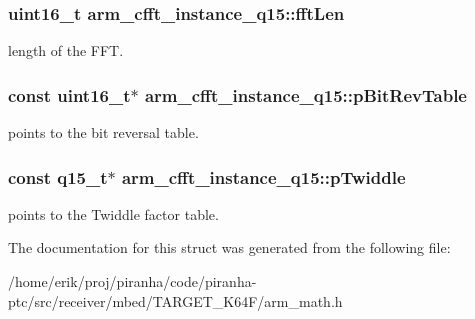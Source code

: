 \subsubsection[{\texorpdfstring{fft\+Len}{fftLen}}]{\setlength{\rightskip}{0pt plus 5cm}uint16\+\_\+t arm\+\_\+cfft\+\_\+instance\+\_\+q15\+::fft\+Len}\hypertarget{structarm__cfft__instance__q15_a5f9e1d3a8c127ee323b5e6929aeb90df}{}\label{structarm__cfft__instance__q15_a5f9e1d3a8c127ee323b5e6929aeb90df}
length of the F\+FT. 
\subsubsection[{\texorpdfstring{p\+Bit\+Rev\+Table}{pBitRevTable}}]{\setlength{\rightskip}{0pt plus 5cm}const uint16\+\_\+t$\ast$ arm\+\_\+cfft\+\_\+instance\+\_\+q15\+::p\+Bit\+Rev\+Table}\hypertarget{structarm__cfft__instance__q15_ac9160b80243b99a0b6e2f75ddb5cf0ae}{}\label{structarm__cfft__instance__q15_ac9160b80243b99a0b6e2f75ddb5cf0ae}
points to the bit reversal table. 
\subsubsection[{\texorpdfstring{p\+Twiddle}{pTwiddle}}]{\setlength{\rightskip}{0pt plus 5cm}const q15\+\_\+t$\ast$ arm\+\_\+cfft\+\_\+instance\+\_\+q15\+::p\+Twiddle}\hypertarget{structarm__cfft__instance__q15_afdaf12ce4687cec021c5ae73d0987a3f}{}\label{structarm__cfft__instance__q15_afdaf12ce4687cec021c5ae73d0987a3f}
points to the Twiddle factor table. 

The documentation for this struct was generated from the following file\+:\begin{DoxyCompactItemize}
\item 
/home/erik/proj/piranha/code/piranha-\/ptc/src/receiver/mbed/\+T\+A\+R\+G\+E\+T\+\_\+\+K64\+F/arm\+\_\+math.\+h\end{DoxyCompactItemize}
